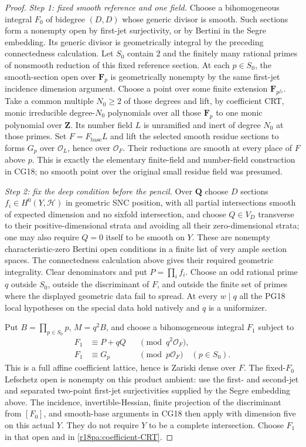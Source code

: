 \begin{proof}
\emph{Step 1: fixed smooth reference and one field.}
Choose a bihomogeneous integral $F_0$ of
bidegree $(D,D)$ whose generic divisor is
smooth.  Such sections form a nonempty open
by first-jet surjectivity, or by Bertini in
the Segre embedding.  Its generic divisor
is geometrically integral by the preceding
connectedness calculation.
Let $S_0$ contain $2$ and the finitely many
rational primes of nonsmooth reduction
of this fixed reference section.
At each $p\in S_0$, the smooth-section
open over $\mathbf F_p$ is geometrically
nonempty by the same first-jet incidence
dimension argument.  Choose a point over
some finite extension $\mathbf F_{p^{f_p}}$.
Take a common multiple $N_0\ge2$ of those
degrees and lift, by coefficient CRT,
monic irreducible degree-$N_0$ polynomials
over all those $\mathbf F_p$ to one
monic polynomial over $\mathbf Z$.
Its number field $L$ is unramified and
inert of degree $N_0$ at those primes.
Set $F=F_{\mathrm{base}}L$ and lift the
selected smooth residue sections to forms
$G_p$ over $\mathcal O_L$, hence over
$\mathcal O_F$.  Their reductions are
smooth at every place of $F$ above $p$.
This is exactly the elementary finite-field
and number-field construction in CG18;
no smooth point over the original small
residue field was presumed.

\emph{Step 2: fix the deep condition before the pencil.}
Over $\mathbf Q$ choose $D$ sections
$f_i\in H^0(Y,\mathcal H)$ in geometric
SNC position, with all partial intersections
smooth of expected dimension and no sixfold
intersection, and choose $Q\in V_D$ transverse
to their positive-dimensional strata and
avoiding all their zero-dimensional strata;
one may also require $Q=0$ itself to be
smooth on $Y$.
These are nonempty characteristic-zero
Bertini open conditions in a finite list
of very ample section spaces.
The connectedness calculation above gives
their required geometric integrality.
Clear denominators and put $P=\prod_i f_i$.
Choose an odd rational prime $q$ outside
$S_0$, outside the discriminant of $F$,
and outside the finite set of primes where
the displayed geometric data fail to
spread.  At every $w\mid q$ all the
PG18 local hypotheses on the special
data hold natively and $q$ is a uniformizer.

Put $B=\prod_{p\in S_0}p$, $M=q^2B$,
and choose a bihomogeneous integral $F_1$
subject to
\[
 \begin{aligned}
 F_1&\equiv P+qQ&&\pmod{q^2\mathcal O_F},\\
 F_1&\equiv G_p&&\pmod{p\mathcal O_F}\quad(p\in S_0).
 \end{aligned}
 \tag{PA18.8}\label{r18pa:coefficient-CRT}
\]
This is a full affine coefficient lattice,
hence is Zariski dense over $F$.
The fixed-$F_0$ Lefschetz open is nonempty
on this product ambient: use the first-
and second-jet and separated two-point
first-jet surjectivities supplied by the
Segre embedding above.  The incidence,
invertible-Hessian, finite projection of
the discriminant from $[F_0]$, and
smooth-base arguments in CG18 then apply
with dimension five on this actual $Y$.
They do not require $Y$ to be a complete
intersection.  Choose $F_1$ in that open
and in \eqref{r18pa:coefficient-CRT}.


\end{proof}
